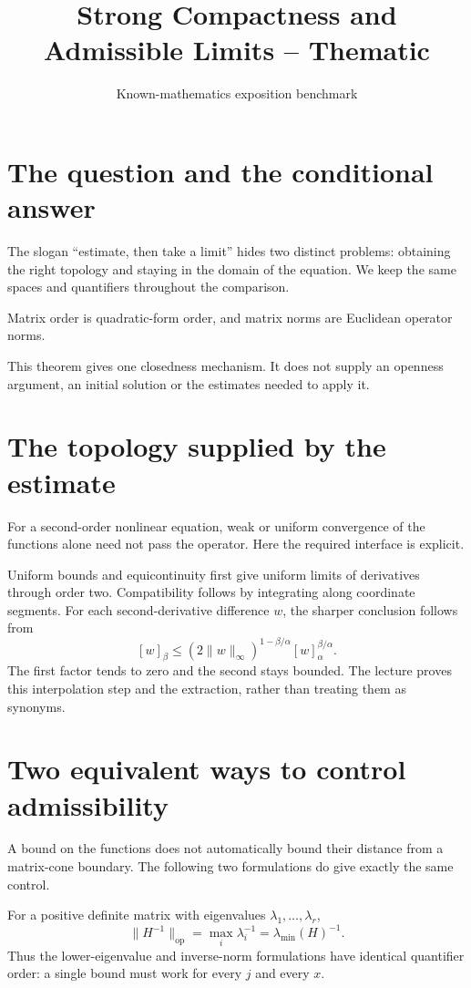 \documentclass[12pt,reqno]{amsart}
\title{Strong Compactness and Admissible Limits -- Thematic}
\author{Known-mathematics exposition benchmark}
\date{}
\begin{document}
\maketitle
\section{The question and the conditional answer}
The slogan ``estimate, then take a limit'' hides two distinct problems:
obtaining the right topology and staying in the domain of the equation.
We keep the same spaces and quantifiers throughout the comparison.



Matrix order is quadratic-form order, and matrix norms are Euclidean operator norms.
\begin{theorem}\label{thm:main}

\end{theorem}
This theorem gives one closedness mechanism. It does not supply an openness
argument, an initial solution or the estimates needed to apply it.

\section{The topology supplied by the estimate}
For a second-order nonlinear equation, weak or uniform convergence of the
functions alone need not pass the operator. Here the required interface is explicit.
\begin{lemma}\label{lem:compactness}

\end{lemma}
Uniform bounds and equicontinuity first give uniform limits of derivatives
through order two. Compatibility follows by integrating along coordinate segments.
For each second-derivative difference $w$, the sharper conclusion follows from
\[
 [w]_\beta\leq (2\|w\|_\infty)^{1-\beta/\alpha}
                   [w]_\alpha^{\beta/\alpha}.
\]
The first factor tends to zero and the second stays bounded. The lecture
proves this interpolation step and the extraction, rather than treating them as synonyms.

\section{Two equivalent ways to control admissibility}
A bound on the functions does not automatically bound their distance from a
matrix-cone boundary. The following two formulations do give exactly the same control.
\begin{lemma}\label{lem:margin}

\end{lemma}
For a positive definite matrix with eigenvalues $\lambda_1,\ldots,\lambda_r$,
\[
 \|H^{-1}\|_{\mathrm{op}}
 =\max_i\lambda_i^{-1}=\lambda_{\min}(H)^{-1}.
\]
Thus the lower-eigenvalue and inverse-norm formulations have identical
quantifier order: a single bound must work for every $j$ and every $x$.
\end{document}
